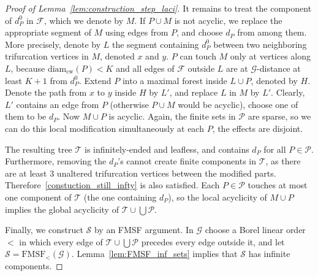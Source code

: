 \documentclass{article}
\theoremstyle{plain}
\theoremstyle{definition}
\newcommand{\cG}{\mathcal{G}}
\newcommand{\cS}{\mathcal{S}}
\newcommand{\cF}{\mathcal{F}}
\newcommand{\mP}{\mathscr P}
\newcommand{\cT}{\mathcal{T}}
\begin{document}
\begin{proof}[Proof of Lemma~\ref{lem:construction_step_laci}]
It remains to treat the component of $d^0_P$ in $\cF$, which we denote by $M$. If $P\cup M$ is not acyclic, we replace the appropriate segment of $M$ using edges from $P$, and choose $d_P$ from among them. More precisely, denote by $L$ the segment containing $d^0_P$ between two neighboring trifurcation vertices in $M$, denoted $x$ and $y$. $P$ can touch $M$ only at vertices along $L$, because $\text{diam}_{\text{cw}}(P) <K$ and all edges of $\cF$ outside $L$ are at $\cG$-distance at least $K+1$ from $d^0_P$. Extend $P$ into a maximal forest inside $L\cup P$, denoted by $H$. Denote the path from $x$ to $y$ inside $H$ by $L'$, and replace $L$ in $M$ by $L'$. Clearly, $L'$ contains an edge from $P$ (otherwise $P \cup M$ would be acyclic), choose one of them to be $d_P$. Now $M \cup P$ is acyclic. Again, the finite sets in $\mP$ are sparse, so we can do this local modification simultaneously at each $P$, the effects are disjoint. 


The resulting tree $\cT$ is infinitely-ended and leafless, and contains $d_P$ for all $P \in \mP$. Furthermore, removing the $d_P$'s cannot create finite components in $\cT$, as there are at least 3 unaltered trifurcation vertices between the modified parts. Therefore~\ref{constuction_still_infty} is also satisfied. Each $P \in \mathscr P$ touches at most one component of $\cT$ (the one containing $d_P$), so the local acyclicity of $M \cup P$ implies the global acyclicity of $\cT \cup \bigcup \mathscr P$.

Finally, we construct $\cS$ by an FMSF argument. In $\cG$ choose a Borel linear order $<$ in which every edge of $ \cT \cup \bigcup \mathscr P$ precedes every edge outside it, and let $\cS= \mathrm{FMSF}_{<}(\cG)$. Lemma~\ref{lem:FMSF_inf_sets} implies that $\cS$ has infinite components. 
\end{proof}
\end{document}

